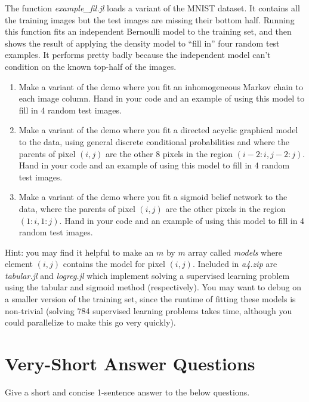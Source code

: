 \documentclass{article}
\def\blu#1{{\color{blu}#1}}
\def\enum#1{\begin{enumerate}#1\end{enumerate}}
\begin{document}
The function \emph{example\_fil.jl} loads a variant of the MNIST dataset. It contains all the training images but the test images are missing their bottom half. Running this function fits an independent Bernoulli model to the training set, and then shows the result of applying the density model to ``fill in'' four random test examples. It performs pretty badly because the independent model can't condition on the known top-half of the images.
\enum{
\item Make a variant of the demo where you fit an inhomogeneous Markov chain to each image column. \blu{Hand in your code and an example of using this model to fill in 4 random test images.}
\item Make a variant of the demo where you fit a directed acyclic graphical model to the data, using general discrete conditional probabilities and where the parents of pixel $(i,j)$ are the other 8 pixels in the region $(i-2:i,j-2:j)$.
\blu{Hand in your code and an example of using this model to fill in 4 random test images.}
\item Make a variant of the demo where you fit a sigmoid belief network to the data, where the parents of pixel $(i,j)$ are the other pixels in the region $(1:i,1:j)$.
\blu{Hand in your code and an example of using this model to fill in 4 random test images.}
}
Hint:  you may find it helpful to make an $m$ by $m$ array called \emph{models} where element $(i,j)$ contains the model for pixel $(i,j)$. Included in \emph{a4.zip} are \emph{tabular.jl} and \emph{logreg.jl} which implement solving a supervised learning problem using the tabular and sigmoid method (respectively). You may want to debug on a smaller version of the training set, since the runtime of fitting these models is non-trivial (solving 784 supervised learning problems takes time, although you could parallelize to make this go very quickly).


\section{Very-Short Answer Questions}



Give a short and concise 1-sentence answer to the below questions.
\end{document}
